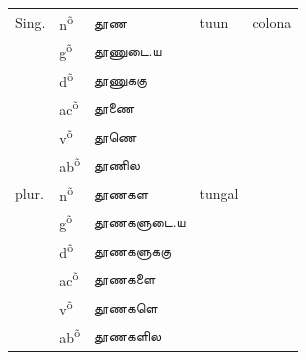 \documentclass[12pt,a4paper]{scrbook}
\begin{document}
      
\begin{tabular}{lllll}
    
        
          Sing. &
          n\textsuperscript{õ} &
          தூண &
          tuun &
          colona \\
    
        
    
        
           &
          g\textsuperscript{õ} &
          தூணுடை.ய \\
    
        
    
        
           &
          d\textsuperscript{õ} &
          தூணுககு \\
    
        
    
        
           &
          ac\textsuperscript{õ} &
          தூணை \\
    
        
    
        
           &
          v\textsuperscript{õ} &
          தூணெ \\
    
        
    
        
           &
          ab\textsuperscript{õ} &
          தூணில \\
    
        
    
        
          plur. &
          n\textsuperscript{õ} &
          தூணகள &
          tungal \\
    
        
    
        
           &
          g\textsuperscript{õ} &
          தூணகளுடை.ய \\
    
        
    
        
           &
          d\textsuperscript{õ} &
          தூணகளுககு \\
    
        
    
        
           &
          ac\textsuperscript{õ} &
          தூணகளை \\
    
        
    
        
           &
          v\textsuperscript{õ} &
          தூணகளெ \\
    
        
    
        
           &
          ab\textsuperscript{õ} &
          தூணகளில \\
    
        
    
      
\end{tabular}
    
\end{document}
